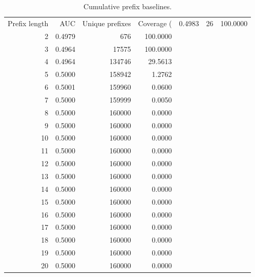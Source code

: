\begin{table}
\caption{Cumulative prefix baselines.}
\label{tab:prefix_baselines}
\begin{tabular}{rrrr}
\toprule
Prefix length & AUC & Unique prefixes & Coverage (%
 & 0.4983 & 26 & 100.0000 \\
2 & 0.4979 & 676 & 100.0000 \\
3 & 0.4964 & 17575 & 100.0000 \\
4 & 0.4964 & 134746 & 29.5613 \\
5 & 0.5000 & 158942 & 1.2762 \\
6 & 0.5001 & 159960 & 0.0600 \\
7 & 0.5000 & 159999 & 0.0050 \\
8 & 0.5000 & 160000 & 0.0000 \\
9 & 0.5000 & 160000 & 0.0000 \\
10 & 0.5000 & 160000 & 0.0000 \\
11 & 0.5000 & 160000 & 0.0000 \\
12 & 0.5000 & 160000 & 0.0000 \\
13 & 0.5000 & 160000 & 0.0000 \\
14 & 0.5000 & 160000 & 0.0000 \\
15 & 0.5000 & 160000 & 0.0000 \\
16 & 0.5000 & 160000 & 0.0000 \\
17 & 0.5000 & 160000 & 0.0000 \\
18 & 0.5000 & 160000 & 0.0000 \\
19 & 0.5000 & 160000 & 0.0000 \\
20 & 0.5000 & 160000 & 0.0000 \\
\bottomrule
\end{tabular}
\end{table}
